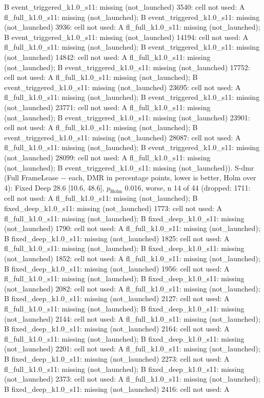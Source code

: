 \begin{table}[t]
{B event\_triggered\_k1.0\_s11: missing (not\_launched) \textbar{} 3540: cell not used: A fl\_full\_k1.0\_s11: missing (not\_launched); B event\_triggered\_k1.0\_s11: missing (not\_launched) \textbar{} 3936: cell not used: A fl\_full\_k1.0\_s11: missing (not\_launched); B event\_triggered\_k1.0\_s11: missing (not\_launched) \textbar{} 14194: cell not used: A fl\_full\_k1.0\_s11: missing (not\_launched); B event\_triggered\_k1.0\_s11: missing (not\_launched) \textbar{} 14842: cell not used: A fl\_full\_k1.0\_s11: missing (not\_launched); B event\_triggered\_k1.0\_s11: missing (not\_launched) \textbar{} 17752: cell not used: A fl\_full\_k1.0\_s11: missing (not\_launched); B event\_triggered\_k1.0\_s11: missing (not\_launched) \textbar{} 23695: cell not used: A fl\_full\_k1.0\_s11: missing (not\_launched); B event\_triggered\_k1.0\_s11: missing (not\_launched) \textbar{} 23771: cell not used: A fl\_full\_k1.0\_s11: missing (not\_launched); B event\_triggered\_k1.0\_s11: missing (not\_launched) \textbar{} 23901: cell not used: A fl\_full\_k1.0\_s11: missing (not\_launched); B event\_triggered\_k1.0\_s11: missing (not\_launched) \textbar{} 28087: cell not used: A fl\_full\_k1.0\_s11: missing (not\_launched); B event\_triggered\_k1.0\_s11: missing (not\_launched) \textbar{} 28099: cell not used: A fl\_full\_k1.0\_s11: missing (not\_launched); B event\_triggered\_k1.0\_s11: missing (not\_launched)). S-dmr (Full FrameLease $-$ each, DMR in percentage points, lower is better, Holm over 4): Fixed Deep 28.6 [10.6, 48.6], $p_\mathrm{Holm}$ 0.016, worse, n 14 of 44 (dropped: 1711: cell not used: A fl\_full\_k1.0\_s11: missing (not\_launched); B fixed\_deep\_k1.0\_s11: missing (not\_launched) \textbar{} 1773: cell not used: A fl\_full\_k1.0\_s11: missing (not\_launched); B fixed\_deep\_k1.0\_s11: missing (not\_launched) \textbar{} 1790: cell not used: A fl\_full\_k1.0\_s11: missing (not\_launched); B fixed\_deep\_k1.0\_s11: missing (not\_launched) \textbar{} 1825: cell not used: A fl\_full\_k1.0\_s11: missing (not\_launched); B fixed\_deep\_k1.0\_s11: missing (not\_launched) \textbar{} 1852: cell not used: A fl\_full\_k1.0\_s11: missing (not\_launched); B fixed\_deep\_k1.0\_s11: missing (not\_launched) \textbar{} 1956: cell not used: A fl\_full\_k1.0\_s11: missing (not\_launched); B fixed\_deep\_k1.0\_s11: missing (not\_launched) \textbar{} 2082: cell not used: A fl\_full\_k1.0\_s11: missing (not\_launched); B fixed\_deep\_k1.0\_s11: missing (not\_launched) \textbar{} 2127: cell not used: A fl\_full\_k1.0\_s11: missing (not\_launched); B fixed\_deep\_k1.0\_s11: missing (not\_launched) \textbar{} 2144: cell not used: A fl\_full\_k1.0\_s11: missing (not\_launched); B fixed\_deep\_k1.0\_s11: missing (not\_launched) \textbar{} 2164: cell not used: A fl\_full\_k1.0\_s11: missing (not\_launched); B fixed\_deep\_k1.0\_s11: missing (not\_launched) \textbar{} 2201: cell not used: A fl\_full\_k1.0\_s11: missing (not\_launched); B fixed\_deep\_k1.0\_s11: missing (not\_launched) \textbar{} 2273: cell not used: A fl\_full\_k1.0\_s11: missing (not\_launched); B fixed\_deep\_k1.0\_s11: missing (not\_launched) \textbar{} 2373: cell not used: A fl\_full\_k1.0\_s11: missing (not\_launched); B fixed\_deep\_k1.0\_s11: missing (not\_launched) \textbar{} 2416: cell not used: A }
\end{table}
